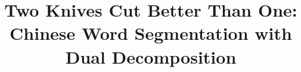 \documentclass[11pt,letterpaper]{article}
\title{Two Knives Cut Better Than One: \\ Chinese Word Segmentation with Dual Decomposition} %
\begin{document}
\maketitle
\begin{CJK}{UTF8}{gbsn} %

 
 \label{sec:intro}
 \label{sec:models}
 \label{sec:experiment}
 \label{sec:results}
 \label{sec:discussion}
 \label{sec:conclusion}




\end{CJK}
\end{document}
